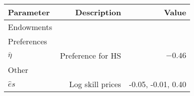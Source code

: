 \begin{tabular}{lrr}
\hline
Parameter & Description  & Value  \\
\hline
Endowments &   &   \\
Preferences &   &   \\
$\bar{\eta}$ & Preference for HS  & $-0.46$  \\
Other &   &   \\
$\hat{e}{s}$ & Log skill prices  & -0.05, -0.01, 0.40  \\
\hline
\end{tabular}%
